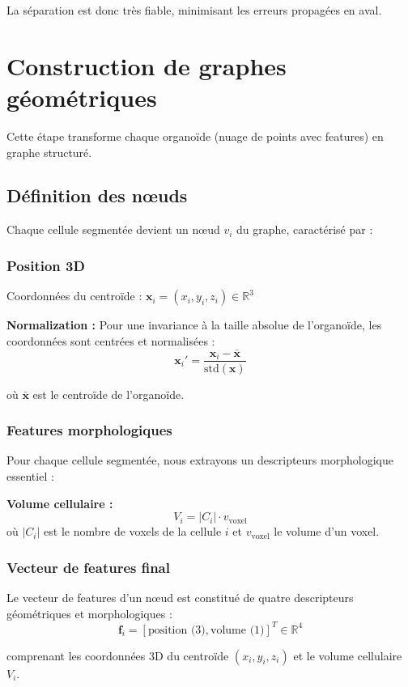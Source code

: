 La séparation est donc très fiable, minimisant les erreurs propagées en aval.

\section{Construction de graphes géométriques}

Cette étape transforme chaque organoïde (nuage de points avec features) en graphe structuré.

\subsection{Définition des nœuds}

Chaque cellule segmentée devient un nœud $v_i$ du graphe, caractérisé par :

\subsubsection{Position 3D}

Coordonnées du centroïde : $\mathbf{x}_i = (x_i, y_i, z_i) \in \mathbb{R}^3$

\textbf{Normalization :}
Pour une invariance à la taille absolue de l'organoïde, les coordonnées sont centrées et normalisées :
\[
\mathbf{x}_i' = \frac{\mathbf{x}_i - \bar{\mathbf{x}}}{\text{std}(\mathbf{x})}
\]

où $\bar{\mathbf{x}}$ est le centroïde de l'organoïde.

\subsubsection{Features morphologiques}

Pour chaque cellule segmentée, nous extrayons un descripteurs morphologique essentiel :

\textbf{Volume cellulaire :}
\[
V_i = |C_i| \cdot v_{\text{voxel}}
\]
où $|C_i|$ est le nombre de voxels de la cellule $i$ et $v_{\text{voxel}}$ le volume d'un voxel.


\subsubsection{Vecteur de features final}

Le vecteur de features d'un nœud est constitué de quatre descripteurs géométriques et morphologiques :
\[
\mathbf{f}_i = [\text{position (3)}, \text{volume (1)}]^T \in \mathbb{R}^{4}
\]

comprenant les coordonnées 3D du centroïde $(x_i, y_i, z_i)$ et le volume cellulaire $V_i$.

